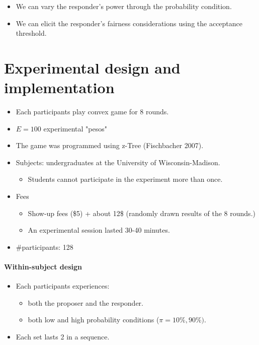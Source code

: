 \documentclass[../root]{subfiles}
\begin{document}
    \begin{itemize}
      \item We can vary the responder's power through the probability condition.
      \item We can elicit the responder's fairness considerations using the acceptance threshold.
    \end{itemize}


    \section{Experimental design and implementation}

    \begin{itemize}
      \item Each participants play convex game for 8 rounds.
      \item $E = 100$ experimental "pesos"
      \item The game was programmed using z-Tree (Fischbacher 2007).
      \item Subjects: undergraduates at the University of Wisconsin-Madison.
      \begin{itemize}
        \item Students cannot participate in the experiment more than once.
      \end{itemize}
      \item Fees
      \begin{itemize}
        \item Show-up fees (\$5) + about 12\$ (randomly drawn results of the 8 rounds.)
        \item An experimental session lasted 30-40 minutes.
      \end{itemize}
      \item \#participants: 128
    \end{itemize}

    \paragraph{Within-subject design}

    \begin{itemize}
      \item Each participants experiences:
      \begin{itemize}
        \item both the proposer and the responder.
        \item both low and high probability conditions ($\pi = 10\%, 90\%)$.
      \end{itemize}
      \item Each set lasts 2 in a sequence.
    \end{itemize}
\end{document}
